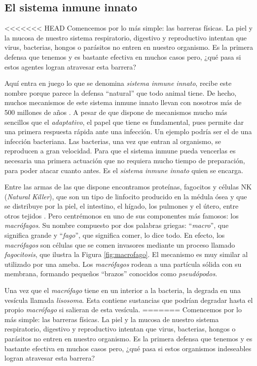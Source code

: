 \subsection{El sistema inmune innato}

<<<<<<< HEAD
Comencemos por lo más simple: las barreras físicas. La piel y la mucosa de nuestro sistema respiratorio, digestivo y reproductivo intentan que virus, bacterias, hongos o parásitos no entren en nuestro organismo. Es la primera defensa que tenemos y es bastante efectiva en muchos casos pero, ¿qué pasa si estos agentes logran atravesar esta barrera?

Aquí entra en juego lo que se denomina \textit{sistema inmune innato}, recibe este nombre porque parece la defensa ``natural'' que todo animal tiene. De hecho, muchos mecanismos de este sistema inmune innato llevan con nosotros más de 500 millones de años \citep{theHowItWorks}. A pesar de que dispone de mecanismos mucho más sencillos que el \textit{adaptativo}, el papel que tiene es fundamental, pues permite dar una primera respuesta rápida ante una infección. Un ejemplo podría ser el de una infección bacteriana. Las bacterias, una vez que entran al organismo, se reproducen a gran velocidad. Para que el sistema inmune pueda vencerlas es necesaria una primera actuación que no requiera mucho tiempo de preparación, para poder atacar cuanto antes. Es el \textit{sistema inmune innato} quien se encarga. 

Entre las armas de las que dispone encontramos proteínas, fagocitos y células NK (\textit{Natural Killer}), que son un tipo de linfocito producido en la médula ósea y que se distribuye por la piel, el intestino, el hígado, los pulmones y el útero, entre otros tejidos \citep{celulasNK}. Pero centrémonos en uno de sus componentes más famosos: los \textit{macrófagos}. Su nombre compuesto por dos palabras griegas: ``\textit{macro}'', que significa grande y ``\textit{fago}'', que significa comer, lo dice todo. En efecto, los \textit{macrófagos} son células que se comen invasores mediante un proceso llamado \textit{fagocitosis}, que ilustra la Figura \ref{fig:macrofago}. El mecanismo es muy similar al utilizado por una ameba. Los \textit{macrófagos} rodean a una partícula sólida con su membrana, formando pequeños ``brazos'' conocidos como \textit{pseudópodos}.

Una vez que el \textit{macrófago} tiene en un interior a la bacteria, la degrada en una vesícula llamada \textit{lisosoma}. Esta contiene sustancias que podrían degradar hasta el propio \textit{macrófago} si salieran de esta vesícula. 
=======
Comencemos por lo más simple: las barreras físicas. La piel y la mucosa de nuestro sistema respiratorio, digestivo y reproductivo intentan que virus, bacterias, hongos o parásitos no entren en nuestro organismo. Es la primera defensa que tenemos y es bastante efectiva en muchos casos pero, ¿qué pasa si estos organismos indeseables logran atravesar esta barrera?

